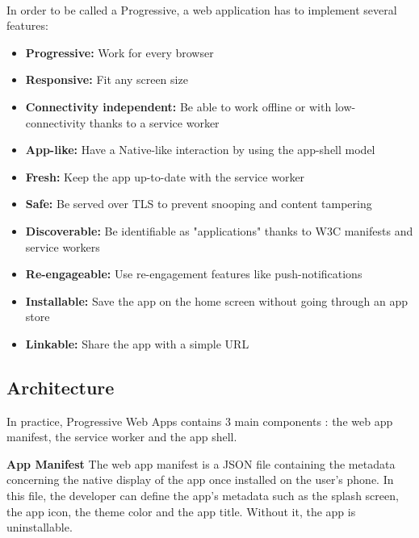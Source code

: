 \documentclass{kththesis}
\begin{document}
\paragraph{}
In order to be called a Progressive, a web application has to implement several features\cite{PWA_def}:

\begin{itemize}
    \item \textbf{Progressive:} Work for every browser
    \item \textbf{Responsive:} Fit any screen size
    \item \textbf{Connectivity independent:} Be able to work offline or with low-connectivity thanks to a service worker
    \item \textbf{App-like:} Have a Native-like interaction by using the app-shell model
    \item \textbf{Fresh:} Keep the app up-to-date with the service worker
    \item \textbf{Safe:} Be served over TLS to prevent snooping and content tampering
    \item \textbf{Discoverable:} Be identifiable as "applications" thanks to W3C manifests and service workers
    \item \textbf{Re-engageable:} Use re-engagement features like push-notifications
    \item \textbf{Installable:} Save the app on the home screen without going through an app store
    \item \textbf{Linkable:} Share the app with a simple URL
\end{itemize}

\subsection{Architecture}

In practice, Progressive Web Apps contains 3 main components : the web app manifest, the service worker and the app shell. 

\medskip
\textbf{App Manifest} \newline
The web app manifest is a JSON file containing the metadata concerning the native display of the app once installed on the user's phone. In this file, the developer can define the app's metadata such as the splash screen, the app icon, the theme color and the app title. Without it, the app is uninstallable.
\end{document}
